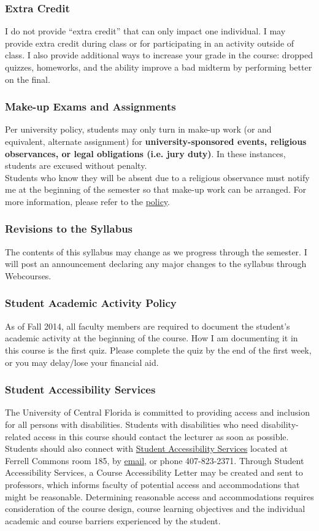 \documentclass[11pt]{paper}
\begin{document}
\subsubsection*{Extra Credit}
I do not provide ``extra credit'' that can only impact one individual. I may provide extra credit during class or for participating in an activity outside of class. I also provide additional ways to increase your grade in the course: dropped quizzes, homeworks, and the ability improve a bad midterm by performing better on the final.
\subsubsection*{Make-up Exams and Assignments}
Per university policy, students may only turn in make-up work (or and equivalent, alternate assignment) for \textbf{university-sponsored events, religious observances, or legal obligations (i.e. jury duty)}. In these instances, students are excused without penalty.\\

Students who know they will be absent due to a religious observance must notify me at the beginning of the semester so that make-up work can be arranged. For more information, please refer to the \href{https://regulations.ucf.edu/docs/notices/5.020ReligiousObservancesNEW_Oct09_000.pdf}{policy}.

\subsubsection*{Revisions to the Syllabus}
The contents of this syllabus may change as we progress through the semester. I will post an announcement declaring any major changes to the syllabus through Webcourses.
\subsubsection*{Student Academic Activity Policy}
As of Fall 2014, all faculty members are required to document the student's academic activity at the beginning of the course. How I am documenting it in this course is the first quiz. Please complete the quiz by the end of the first week, or you may delay/lose your financial aid. 
\subsubsection*{Student Accessibility Services}
The University of Central Florida is committed to providing access and inclusion for all persons with disabilities. Students with disabilities who need disability-related access in this course should contact the lecturer as soon as possible. Students should also connect with \href{https://sas.sdes.ucf.edu}{Student Accessibility Services} located at Ferrell Commons room 185, by \href{mailto:emailsas@ucf.edu}{email}, or phone 407-823-2371. Through Student Accessibility Services, a Course Accessibility Letter may be created and sent to professors, which informs faculty of potential access and accommodations that might be reasonable. Determining reasonable access and accommodations requires consideration of the course design, course learning objectives and the individual academic and course barriers experienced by the student.
\end{document}
